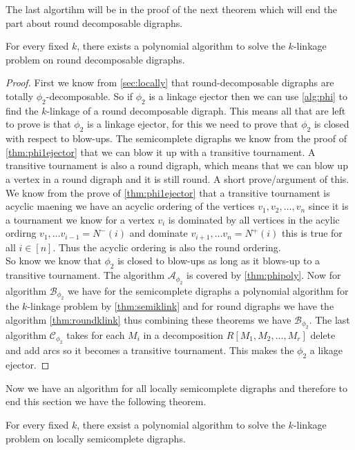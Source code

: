 The last algortihm will be in the proof of the next theorem which will end the part about round decomposable digraphs.
\begin{thm}
    For every fixed $k$, there exists a polynomial algorithm to solve the $k$-linkage problem on round decomposable digraphs.
\end{thm}
\begin{proof}
    First we know from \autoref{sec:locally} that round-decomposable digraphs are totally $\phi_2$-decomposable. So if $\phi_2$ is a linkage ejector then we can use \autoref{alg:phi} to find the $k$-linkage of a round decomposable digraph. This means all that are left to prove is that $\phi_2$ is a linkage ejector, for this we need to prove that $\phi_2$ is closed with respect to blow-ups.
    The semicomplete digraphs we know from the proof of \autoref{thm:phi1ejector} that we can blow it up with a transitive tournament. 
    A transitive tournament is also a round digraph, which means that we can blow up a vertex in a round digraph and it is still round. A short prove/argument of this.\\
    We know from the prove of \autoref{thm:phi1ejector} that a transitive tournament is acyclic maening we have an acyclic ordering of the vertices $v_1,v_2,\dots , v_n$ since it is a tournament we know for a vertex $v_i$ is dominated by all vertices in the acylic ordirng $v_1,\dots v_{i-1}=N^-(i)$ and dominate $v_{i+1},\dots v_n=N^+(i)$ this is true for all $i\in[n]$. Thus the acyclic ordering is also the round ordering.\\
    So know we know that $\phi_2$ is closed to blow-ups as long as it blows-up to a transitive tournament. 
    The algorithm $\mathcal{A}_{\phi_2}$ is covered by \autoref{thm:phipoly}.
    Now for algorithm $\mathcal{B}_{\phi_2}$ we have for the semicomplete digraphs a polynomial algorithm for the $k$-linkage problem by \autoref{thm:semiklink} and for round digraphs we have the algorithm \autoref{thm:roundklink} thus combining these theorems we have $\mathcal{B}_{\phi_2}$. 
    The last algorithm $\mathcal{C}_{\phi_2}$ takes for each $M_i$ in a decomposition $R[M_1,M_2,\dots , M_r]$ delete and add arcs so it becomes a transitive tournament. 
    This makes the $\phi_2$ a likage ejector.
\end{proof}
Now we have an algorithm for all locally semicomplete digraphs and therefore to end this section we have the following theorem.
\begin{thm}
    For every fixed $k$, there exsist a polynomial algorithm to solve the $k$-linkage problem on locally semicomplete digraphs.
\end{thm}
